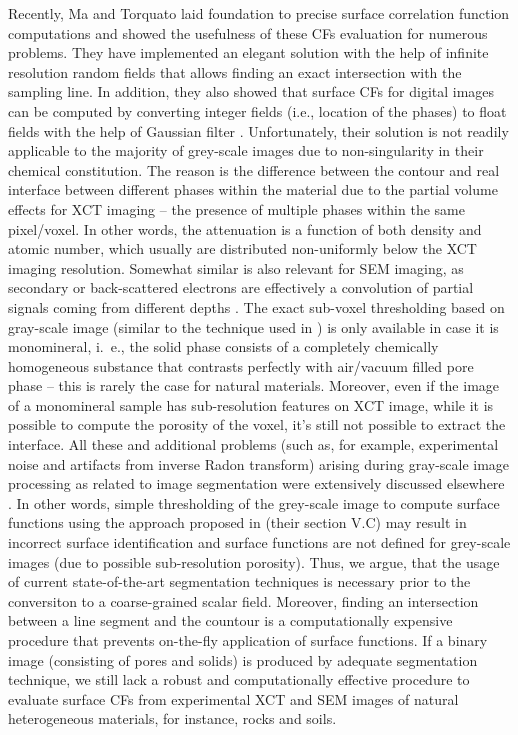 \documentclass[reprint,amsmath,amssymb,aps,pre,showkeys,showpacs]{revtex4-1}
\begin{document}
Recently, Ma and Torquato \cite{ma2018SS} laid foundation to precise surface
correlation function computations and showed the usefulness of these CFs
evaluation for numerous problems. They have implemented an elegant solution with
the help of infinite resolution random fields that allows finding an exact
intersection with the sampling line. In addition, they also showed that surface
CFs for digital images can be computed by converting integer fields (i.e.,
location of the phases) to float fields with the help of Gaussian filter
\cite{ma2018SS}. Unfortunately, their solution is not readily applicable to the
majority of grey-scale images due to non-singularity in their chemical
constitution. The reason is the difference between the contour and real
interface between different phases within the material due to the partial volume
effects \cite{Wildenschild_Sheppard} for XCT imaging -- the presence of multiple
phases within the same pixel/voxel. In other words, the attenuation is a
function of both density and atomic number, which usually are distributed
non-uniformly below the XCT imaging resolution. Somewhat similar is also
relevant for SEM imaging, as secondary or back-scattered electrons are
effectively a convolution of partial signals coming from different depths
\cite{Bultreys_review}. The exact sub-voxel thresholding based on gray-scale
image (similar to the technique used in \cite{ma2018SS}) is only available in
case it is monomineral, i.~e., the solid phase consists of a completely
chemically homogeneous substance that contrasts perfectly with air/vacuum filled
pore phase -- this is rarely the case for natural materials. Moreover, even if
the image of a monomineral sample has sub-resolution features on XCT image,
while it is possible to compute the porosity of the voxel, it's still not
possible to extract the interface. All these and additional problems (such as,
for example, experimental noise and artifacts from inverse Radon transform)
arising during gray-scale image processing as related to image segmentation were
extensively discussed elsewhere \cite{NNseg}. In other words, simple
thresholding of the grey-scale image to compute surface functions using the
approach proposed in \cite{ma2018SS} (their section V.C) may result in incorrect
surface identification and surface functions are not defined for grey-scale
images (due to possible sub-resolution porosity). Thus, we argue, that the usage
of current state-of-the-art segmentation techniques is necessary prior to the
conversiton to a coarse-grained scalar field. Moreover, finding an intersection
between a line segment and the countour is a computationally expensive procedure
that prevents on-the-fly application of surface functions. If a binary image
(consisting of pores and solids) is produced by adequate segmentation technique,
we still lack a robust and computationally effective procedure to evaluate
surface CFs from experimental XCT and SEM images of natural heterogeneous
materials, for instance, rocks and soils.
\end{document}
